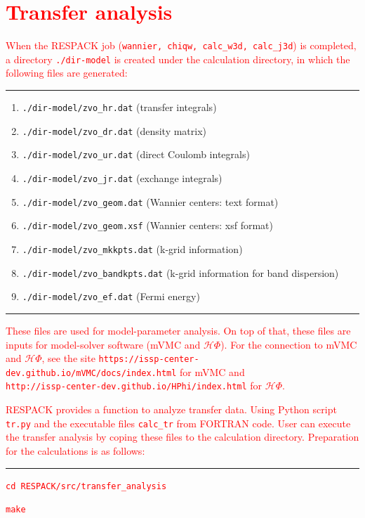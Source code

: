 \documentclass{article}
\newcommand{\tr}[1]{\textcolor{red}{#1}}
\begin{document}
\clearpage 

\section{\tr{Transfer analysis}}
\tr{When the RESPACK job ({\tt wannier, chiqw, calc\_w3d, calc\_j3d}) is completed, a directory {\tt ./dir-model} is created under the calculation directory, in which the following files are generated:}
\vspace{3mm}\hrule
\begin{enumerate}
\item \verb+./dir-model/zvo_hr.dat+ (transfer integrals)
\item \verb+./dir-model/zvo_dr.dat+ (density matrix)
\item \verb+./dir-model/zvo_ur.dat+ (direct Coulomb integrals)
\item \verb+./dir-model/zvo_jr.dat+ (exchange integrals)
\item \verb+./dir-model/zvo_geom.dat+ (Wannier centers: text format)
\item \verb+./dir-model/zvo_geom.xsf+ (Wannier centers: xsf format)
\item \verb+./dir-model/zvo_mkkpts.dat+ (k-grid information)
\item \verb+./dir-model/zvo_bandkpts.dat+ (k-grid information for band dispersion)
\item \verb+./dir-model/zvo_ef.dat+ (Fermi energy)
\end{enumerate}
\hrule\vspace{3mm}
\tr{These files are used for model-parameter analysis. On top of that, these files are inputs for model-solver software (mVMC and $\mathcal{H}\Phi$).  For the connection to mVMC and $\mathcal{H}\Phi$, see the site \texttt{https://issp-center-dev.github.io/mVMC/docs/index.html} for mVMC and \\   \texttt{http://issp-center-dev.github.io/HPhi/index.html} for $\mathcal{H}\Phi$.}

\tr{RESPACK provides a function to analyze transfer data. Using {\sc Python} script {\tt tr.py} and the executable files {\tt calc\_tr} from {\sc FORTRAN} code. User can execute the transfer analysis by coping these files to the calculation directory. Preparation for the calculations is as follows:} 
\vspace{3mm}\hrule\vspace{3mm}
\tr{\texttt{cd RESPACK/src/transfer\_analysis}}

\tr{\texttt{make}} 
\end{document}
